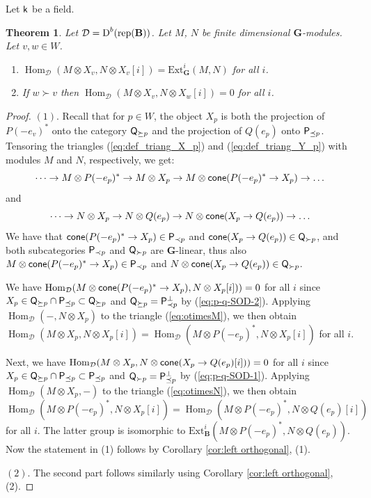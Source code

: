 \documentclass[sn-mathphys-num]{sn-jnl}%
\newcommand{\D}{\mathcal D}
\newcommand{\rep}{{\mathrm{rep}}}
\newcommand{\Ext}{{\mathrm{Ext}}}
\newcommand*{\Dd}{\mathop{\mathrm D\kern0pt}\nolimits}
\newcommand*{\Hom}{\mathop{\mathrm {Hom}}\nolimits}
\newcommand{\sk}{{\sf k}}
\newcommand{\bg}{\mathbf G}
\newcommand{\fb}{\mathbf B}
\newtheorem{theorem}{Theorem}[section]
\theoremstyle{definition}
\begin{document}
 Let $\sk$ be a field.
\begin{theorem}\label{th:X_p-G-exceptional-coll}
Let $\D=\Dd^b (\rep ({\fb}))$.
Let $M$, $N$ be finite dimensional $ \bg $-modules. Let $v,w\in W$.
\begin{enumerate}
\item $\Hom_\D(M\otimes X_v,N\otimes X_v[i])=\Ext^i_ \bg (M,N) $ for all $i$.
\item If $w\succ  v$ then $\Hom_\D(M\otimes X_v,N\otimes X_w[i])=0$ for all $i$.
\end{enumerate}
\end{theorem}
\begin{proof}
$(1).$ Recall that for $p\in W$, the object $X_p$ is both the projection of $P(-e_v)^*$ onto the category ${\sf Q}_{\succeq p}$ and the projection of $Q(e_p)$ onto ${\sf P}_{\preceq p}$. 
Tensoring the triangles (\ref{eq:def_triang_X_p}) and (\ref{eq:def_triang_Y_p}) with modules $M$ and $N$, respectively, we get:
\begin{equation}\label{eq:otimesM}
\dots \rightarrow M\otimes P(-e_p)^*\rightarrow M\otimes X_p\rightarrow M\otimes {\sf cone}(P(-e_p)^*\rightarrow X_p)\rightarrow \dots 
\end{equation}
and 
\begin{equation}\label{eq:otimesN}
\dots \rightarrow N\otimes X_p\rightarrow N\otimes Q(e_p)\rightarrow N\otimes {\sf cone}(X_p\rightarrow Q(e_p))\rightarrow \dots 
\end{equation}
We have that ${\sf cone}(P(-e_p)^*\rightarrow X_p)\in {\sf P}_{\prec p}$ and ${\sf cone}(X_p\rightarrow Q(e_p))\in {\sf Q}_{\succ p}$, and both subcategories ${\sf P}_{\prec p}$ and ${\sf Q}_{\succ p}$ are $ \bg$-linear, thus also
$M\otimes {\sf cone}(P(-e_p)^*\rightarrow X_p)\in {\sf P}_{\prec p}$ and $N\otimes {\sf cone}(X_p\rightarrow Q(e_p))\in {\sf Q}_{\succ p}$. 

We have $\Hom _{\D}(M\otimes {\sf cone}(P(-e_p)^*\rightarrow X_p),N\otimes X_p[i]))=0$ for all $i$ since $X_p\in {\sf Q}_{\succeq p}\cap {\sf P}_{\preceq p}\subset {\sf Q}_{\succeq p}$ and ${\sf Q}_{\succeq p}={\sf P}_{\prec p}^{\perp}$ by 
 (\ref{eq:p-q-SOD-2}). Applying $\Hom _{\D}(-,N\otimes X_p)$ to the triangle (\ref{eq:otimesM}), we then obtain $\Hom _{\D}(M\otimes X_p,N\otimes X_p[i])=\Hom _{\D}(M\otimes P(-e_p)^*,N\otimes X_p[i])$ for all $i$.
 
Next, we have $\Hom _{\D}(M\otimes X_p,N\otimes {\sf cone}(X_p\rightarrow Q(e_p)[i]))=0$ for all $i$ since $X_p\in {\sf Q}_{\succeq p}\cap {\sf P}_{\preceq p}\subset {\sf P}_{\preceq p}$ and ${\sf Q}_{\succ p}={\sf P}_{\preceq p}^{\perp}$ by 
 (\ref{eq:p-q-SOD-1}). Applying $\Hom _{\D}(M\otimes X_p,-)$ to the triangle (\ref{eq:otimesN}), we then obtain $\Hom _{\D}(M\otimes P(-e_p)^*,N\otimes X_p[i])=\Hom _{\D}(M\otimes P(-e_p)^*,N\otimes Q(e_p)[i])$ for all $i$. The latter group is isomorphic to $\Ext ^i_{\fb}(M\otimes P(-e_p)^*,N\otimes Q(e_p))$. Now the statement in (1) follows by Corollary \ref{cor:left orthogonal}, (1).



$(2).$ The second part follows similarly using Corollary \ref{cor:left orthogonal}, (2).
\end{proof}
\end{document}
